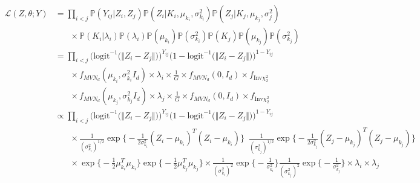 \documentclass{article}
\begin{document}
\begin{align*}
\mathcal{L}(Z, \theta; Y) &= \prod_{i<j}\mathbb{P}(Y_{ij} | Z_i, Z_j) \mathbb{P}(Z_i | K_i, \mu_{k_i}, \sigma_{k_i}^2) \mathbb{P}(Z_j | K_j, \mu_{k_j}, \sigma_j^2) \\ 
&\ \ \ \ \ \ \ \ \times  \mathbb{P}(K_i | \lambda_i) \mathbb{P}(\lambda_i)\mathbb{P}(\mu_{k_i})\mathbb{P}(\sigma_{k_i}^2)\mathbb{P}(K_j)\mathbb{P}(\mu_{k_j})\mathbb{P}(\sigma_{k_j}^2) \\
&= \prod_{i<j}\Big(\text{logit}^{-1}\big(\Vert Z_i-Z_j\Vert)\Big)^{Y_{ij}}\Big(1 - \text{logit}^{-1}\big(\Vert Z_i-Z_j\Vert)\Big)^{1 - Y_{ij}} \\
&\ \ \ \ \ \ \ \ \times f_{{MVN}_d} (\mu_{k_i}, \sigma_{k_i}^2I_d)\times\lambda_i \times \frac{1}{G} \times f_{{MVN}_d} (0, I_d) \times f_{\text{Inv}\chi^2_2} \\
&\ \ \ \ \ \ \ \ \times f_{{MVN}_d}(\mu_{k_j}, \sigma_{k_j}^2I_d)\times  \lambda_j \times \frac{1}{G} \times f_{{MVN}_d} (0, I_d) \times f_{\text{Inv}\chi^2_2} \\
&\propto \prod_{i<j}\Big(\text{logit}^{-1}\big(\Vert Z_i-Z_j\Vert)\Big)^{Y_{ij}}\Big(1 - \text{logit}^{-1}\big(\Vert Z_i-Z_j\Vert)\Big)^{1 - Y_{ij}} \\
&\ \ \ \ \ \ \ \ \times \frac{1}{(\sigma_{k_i}^2)^{1/2}}\exp\Big\{-\frac{1}{2\sigma_{k_i}^2}(Z_i - \mu_{k_i})^T( Z_i - \mu_{k_i}) \Big\} \enspace \frac{1}{(\sigma_{k_j}^2)^{1/2}}\exp\Big\{-\frac{1}{2\sigma_{k_j}^2}(Z_j - \mu_{k_j})^T (Z_j - \mu_{k_j})\Big\} \\
&\ \ \ \ \ \ \ \ \times \exp\Big\{-\frac{1}{2}\mu_{k_i}^T\mu_{k_i}\Big\}\exp\Big\{-\frac{1}{2}\mu_{k_j}^T\mu_{k_j}\Big\}  \times \frac{1}{(\sigma_{k_i}^2)^2}\exp\Big\{-\frac{1}{\sigma_{k_i}^2}\Big\}\frac{1}{(\sigma_{k_j}^2)^2}\exp\Big\{-\frac{1}{\sigma_{k_j}^2}\Big\} \times \lambda_i \times \lambda_j
\end{align*}


\end{document}
